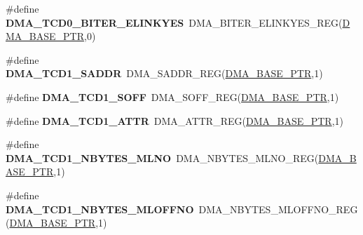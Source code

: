 \begin{DoxyCompactItemize}
\item 
\hypertarget{group___d_m_a___register___accessor___macros_ga2521a084ea42e98eeceb804e5f7ecb76}{}\#define {\bfseries D\+M\+A\+\_\+\+T\+C\+D0\+\_\+\+B\+I\+T\+E\+R\+\_\+\+E\+L\+I\+N\+K\+Y\+E\+S}~D\+M\+A\+\_\+\+B\+I\+T\+E\+R\+\_\+\+E\+L\+I\+N\+K\+Y\+E\+S\+\_\+\+R\+E\+G(\hyperlink{group___d_m_a___peripheral_ga6997fbc1b1973e9f27170217a3bd6f22}{D\+M\+A\+\_\+\+B\+A\+S\+E\+\_\+\+P\+T\+R},0)\label{group___d_m_a___register___accessor___macros_ga2521a084ea42e98eeceb804e5f7ecb76}

\item 
\hypertarget{group___d_m_a___register___accessor___macros_ga94212bd95654bfd40e69abc92d60ba81}{}\#define {\bfseries D\+M\+A\+\_\+\+T\+C\+D1\+\_\+\+S\+A\+D\+D\+R}~D\+M\+A\+\_\+\+S\+A\+D\+D\+R\+\_\+\+R\+E\+G(\hyperlink{group___d_m_a___peripheral_ga6997fbc1b1973e9f27170217a3bd6f22}{D\+M\+A\+\_\+\+B\+A\+S\+E\+\_\+\+P\+T\+R},1)\label{group___d_m_a___register___accessor___macros_ga94212bd95654bfd40e69abc92d60ba81}

\item 
\hypertarget{group___d_m_a___register___accessor___macros_ga2ef23070556cc663eb4b1189fb07e121}{}\#define {\bfseries D\+M\+A\+\_\+\+T\+C\+D1\+\_\+\+S\+O\+F\+F}~D\+M\+A\+\_\+\+S\+O\+F\+F\+\_\+\+R\+E\+G(\hyperlink{group___d_m_a___peripheral_ga6997fbc1b1973e9f27170217a3bd6f22}{D\+M\+A\+\_\+\+B\+A\+S\+E\+\_\+\+P\+T\+R},1)\label{group___d_m_a___register___accessor___macros_ga2ef23070556cc663eb4b1189fb07e121}

\item 
\hypertarget{group___d_m_a___register___accessor___macros_ga39a0c29d2a82a8e6bd8f88bb52ab5210}{}\#define {\bfseries D\+M\+A\+\_\+\+T\+C\+D1\+\_\+\+A\+T\+T\+R}~D\+M\+A\+\_\+\+A\+T\+T\+R\+\_\+\+R\+E\+G(\hyperlink{group___d_m_a___peripheral_ga6997fbc1b1973e9f27170217a3bd6f22}{D\+M\+A\+\_\+\+B\+A\+S\+E\+\_\+\+P\+T\+R},1)\label{group___d_m_a___register___accessor___macros_ga39a0c29d2a82a8e6bd8f88bb52ab5210}

\item 
\hypertarget{group___d_m_a___register___accessor___macros_ga815c5f40d67ad04ac54fdb097ba16f7f}{}\#define {\bfseries D\+M\+A\+\_\+\+T\+C\+D1\+\_\+\+N\+B\+Y\+T\+E\+S\+\_\+\+M\+L\+N\+O}~D\+M\+A\+\_\+\+N\+B\+Y\+T\+E\+S\+\_\+\+M\+L\+N\+O\+\_\+\+R\+E\+G(\hyperlink{group___d_m_a___peripheral_ga6997fbc1b1973e9f27170217a3bd6f22}{D\+M\+A\+\_\+\+B\+A\+S\+E\+\_\+\+P\+T\+R},1)\label{group___d_m_a___register___accessor___macros_ga815c5f40d67ad04ac54fdb097ba16f7f}

\item 
\hypertarget{group___d_m_a___register___accessor___macros_gad6f0e77e436a6181f1de8a5c76f852e4}{}\#define {\bfseries D\+M\+A\+\_\+\+T\+C\+D1\+\_\+\+N\+B\+Y\+T\+E\+S\+\_\+\+M\+L\+O\+F\+F\+N\+O}~D\+M\+A\+\_\+\+N\+B\+Y\+T\+E\+S\+\_\+\+M\+L\+O\+F\+F\+N\+O\+\_\+\+R\+E\+G(\hyperlink{group___d_m_a___peripheral_ga6997fbc1b1973e9f27170217a3bd6f22}{D\+M\+A\+\_\+\+B\+A\+S\+E\+\_\+\+P\+T\+R},1)\label{group___d_m_a___register___accessor___macros_gad6f0e77e436a6181f1de8a5c76f852e4}


\end{DoxyCompactItemize}
